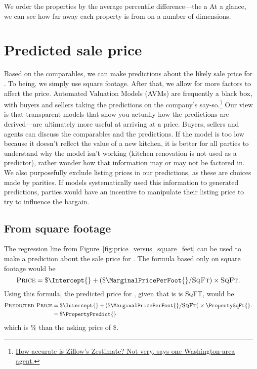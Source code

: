\documentclass[
12pt, %
letterpaper, %
oneside, %
headinclude,footinclude, %
BCOR5mm, %
]{scrartcl}
\begin{document}
We order the properties by the average percentile difference---the a
At a glance, we can see how far away each property is from \PropertyName{} on a number of dimensions. 

\section{Predicted sale price}
Based on the comparables, we can make predictions about the likely sale price for \PropertyName{}. 
To being, we simply use square footage.
After that, we allow for more factors to affect the price.
Automated Valuation Models (AVMs) are frequently a black box, with buyers and sellers taking the predictions on the company's say-so.\footnote{\href{https://www.washingtonpost.com/news/where-we-live/wp/2014/06/10/how-accurate-is-zillows-zestimate-not-very-says-one-washington-area-agent/?noredirect=on&utm_term=.e3453c7b3677}{How accurate is Zillow's Zestimate? Not very, says one Washington-area agent.}
  }
Our view is that transparent models that show you actually how the predictions are derived---are ultimately more useful at arriving at a price.
Buyers, sellers and agents can discuss the comparables and the predictions.
If the model is too low because it doesn't reflect the value of a new kitchen, it is better for all parties to understand why the model isn't working (kitchen renovation is not used as a predictor), rather wonder how that information may or may not be factored in.
We also purposefully exclude listing prices in our predictions, as these are choices made by parities.
If models systematically used this information to generated predictions, parties would have an incentive to manipulate their listing price to try to influence the bargain. 

\subsection{From square footage}

The regression line from Figure~\ref{fig:price_versus_square_feet} can be used to make a prediction about the sale price for \PropertyName{}. 
The formula based only on square footage would be
\begin{equation}
  \textsc{Price} = \$ \Intercept{} + (\$ \MarginalPricePerFoot{}/\textsc{SqFt}) \times \textsc{SqFt}. \nonumber
\end{equation}
Using this formula, the predicted price for \PropertyName{}, given that is is \PropertySqFt{} \textsc{SqFT}, would be
\begin{align}
\textsc{Predicted Price} & = \$ \Intercept{} + (\$ \MarginalPricePerFoot{}/\textsc{SqFt}) \times \PropertySqFt{}. \\ \nonumber
                         & = \$ \PropertyPredict{} \nonumber 
\end{align}
which is \PctDiff{}\% \ComparePredictedToActual{} than the asking price of \$\PropertyPrice{}.
\end{document}
